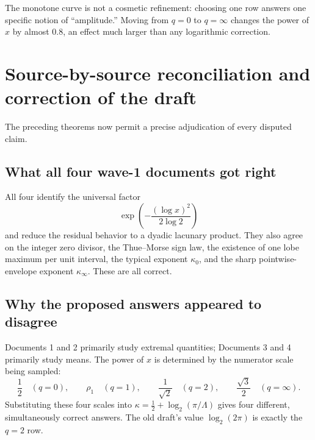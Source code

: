 \documentclass[11pt,oneside]{article}
\theoremstyle{definition}
\theoremstyle{remark}
\begin{document}
\begin{center}
\end{center}

The monotone curve is not a cosmetic refinement: choosing one row answers one specific
notion of ``amplitude.''  Moving from $q=0$ to $q=\infty$ changes the power of $x$ by almost
$0.8$, an effect much larger than any logarithmic correction.

\section{Source-by-source reconciliation and correction of the draft}
\label{sec:source-reconciliation}

The preceding theorems now permit a precise adjudication of every disputed claim.

\subsection{What all four wave-1 documents got right}

All four identify the universal factor
\[
 \exp\!\left(-\frac{(\log x)^2}{2\log2}\right)
\]
and reduce the residual behavior to a dyadic lacunary product.  They also agree on the
integer zero divisor, the Thue--Morse sign law, the existence of one lobe maximum per unit
interval, the typical exponent $\kappa_0$, and the sharp pointwise-envelope exponent
$\kappa_\infty$.  These are all correct.

\subsection{Why the proposed answers appeared to disagree}

Documents 1 and 2 primarily study extremal quantities; Documents 3 and 4 primarily study
means.  The power of $x$ is determined by the numerator scale being sampled:
\[
 \frac12\quad(q=0),\qquad
 \rho_1\quad(q=1),\qquad
 \frac1{\sqrt2}\quad(q=2),\qquad
 \frac{\sqrt3}{2}\quad(q=\infty).
\]
Substituting these four scales into
$\kappa=\tfrac12+\log_2(\pi/\Lambda)$ gives four different, simultaneously correct
answers.  The old draft's value $\log_2(2\pi)$ is exactly the $q=2$ row.
\end{document}

